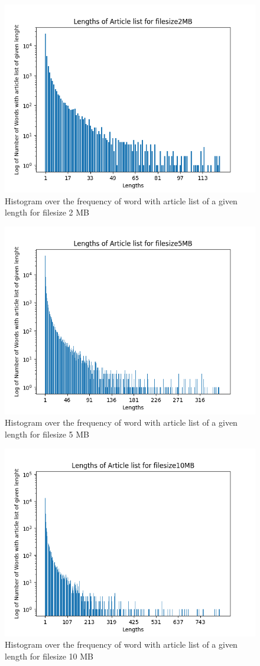 \begin{figure}[ht!]
    \centering
    \includegraphics[width=.5\textwidth]{LaTeX/Pictures/Results/ArticleLengthg2MB.png}
    \caption{Histogram over the frequency of word with article list of a given length for filesize 2 MB}
    \label{fig:Articlelength2}
\end{figure}

\begin{figure}[ht!]
    \centering
    \includegraphics[width=.5\textwidth]{LaTeX/Pictures/Results/ArticleLengthg5MB.png}
    \caption{Histogram over the frequency of word with article list of a given length for filesize 5 MB}
    \label{fig:Articlelength5}
\end{figure}

\begin{figure}[ht!]
    \centering
    \includegraphics[width=.5\textwidth]{LaTeX/Pictures/Results/ArticleLengthg10MB.png}
    \caption{Histogram over the frequency of word with article list of a given length for filesize 10 MB}
    \label{fig:Articlelength10}
\end{figure}

